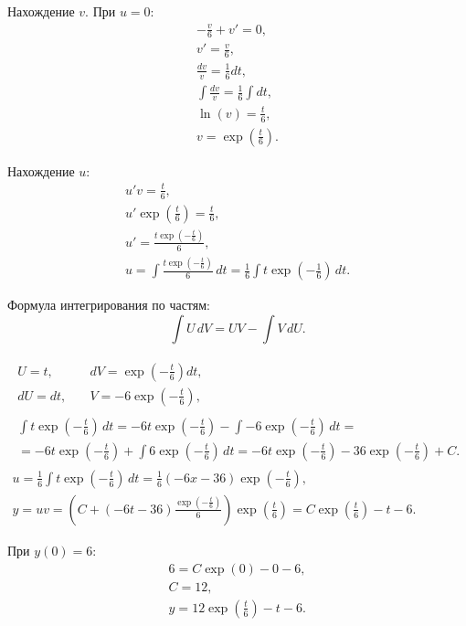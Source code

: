\documentclass[10pt, a4paper, titlepage]{article}
\begin{document}
Нахождение $v$. При $u=0$:
\begin{gather*}
    -\frac{v}{6}+v'=0 ,\\
    v'=\frac{v}{6} ,\\
    \frac{dv}{v}=\frac{1}{6}dt ,\\
    \int\frac{dv}{v}=\frac{1}{6}\int dt ,\\
    \ln(v)=\frac{t}{6} ,\\
    v=\exp\left(\frac{t}{6}\right) .
\end{gather*}

Нахождение $u$:
\begin{gather*}
    u'v=\frac{t}{6} ,\\
    u'\exp\left(\frac{t}{6}\right)=\frac{t}{6} ,\\
    u'=\frac{t\exp\left(-\frac{t}{6}\right)}{6} ,\\
    u=\int\frac{t\exp\left(-\frac{t}{6}\right)}{6}\,dt = \frac{1}{6}\int t\exp\left(-\frac{1}{6}\right)\,dt .
\end{gather*}

Формула интегрирования по частям:
$$\int U\,dV = UV - \int V \,dU .$$

\begin{gather*}
    \begin{aligned}
        U=t , &\quad dV=\exp\left(-\frac{t}{6}\right)dt ,\\
        dU=dt , &\quad V=-6\exp\left(-\frac{t}{6}\right) ,
    \end{aligned} 
    \\
    \begin{multlined}
        \int t\exp\left(-\frac{t}{6}\right)\,dt=-6t\exp\left(-\frac{t}{6}\right)-\int-6\exp\left(-\frac{t}{6}\right)\,dt = \\
        = -6t\exp\left(-\frac{t}{6}\right)+\int6\exp\left(-\frac{t}{6}\right)\,dt=-6t\exp\left(-\frac{t}{6}\right)-36\exp\left(-\frac{t}{6}\right)+C .
    \end{multlined}
    \\
    u=\frac{1}{6}\int t\exp\left(-\frac{t}{6}\right)\,dt = \frac{1}{6}(-6x-36)\exp\left(-\frac{t}{6}\right) ,\\
    y=uv=\left(C+(-6t-36)\frac{\exp\left(-\frac{t}{6}\right)}{6}\right)\exp\left(\frac{t}{6}\right)=C\exp\left(\frac{t}{6}\right)-t-6 .
\end{gather*}

При $y(0)=6$:
\begin{gather*}
    6 = C\exp(0)-0-6 ,\\
    C = 12 ,\\
    y = 12\exp\left(\frac{t}{6}\right)-t-6 .
\end{gather*}
\end{document}
